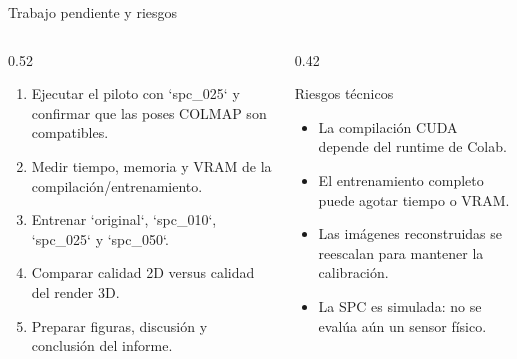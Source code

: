 \documentclass[aspectratio=169,11pt]{beamer}
\begin{document}
\begin{frame}{Trabajo pendiente y riesgos}
\begin{columns}[T,onlytextwidth]
  \begin{column}{0.52\textwidth}
    \begin{enumerate}
      \item Ejecutar el piloto con `spc\_025` y confirmar que las poses COLMAP son compatibles.
      \item Medir tiempo, memoria y VRAM de la compilación/entrenamiento.
      \item Entrenar `original`, `spc\_010`, `spc\_025` y `spc\_050`.
      \item Comparar calidad 2D versus calidad del render 3D.
      \item Preparar figuras, discusión y conclusión del informe.
    \end{enumerate}
  \end{column}
  \begin{column}{0.42\textwidth}
    \begin{block}{Riesgos técnicos}
      \begin{itemize}
        \item La compilación CUDA depende del runtime de Colab.
        \item El entrenamiento completo puede agotar tiempo o VRAM.
        \item Las imágenes reconstruidas se reescalan para mantener la calibración.
        \item La SPC es simulada: no se evalúa aún un sensor físico.
      \end{itemize}
    \end{block}
  \end{column}
\end{columns}
\end{frame}
\end{document}
